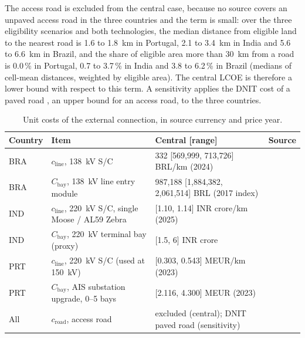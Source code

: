 The access road is excluded from the central case, because no source
covers an unpaved access road in the three countries and the term is
small: over the three eligibility scenarios and both technologies, the
median distance from eligible land to the nearest road is 1.6 to 1.8~km
in Portugal, 2.1 to 3.4~km in India and 5.6 to 6.6~km in Brazil, and the
share of eligible area more than 30~km from a road is 0.0\,\% in Portugal,
0.7 to 3.7\,\% in India and 3.8 to 6.2\,\% in Brazil (medians of cell-mean
distances, weighted by eligible area).
The central LCOE is therefore a lower
bound with respect to this term. A sensitivity applies the DNIT cost of a
paved road \cite{dnit2016}, an upper bound for an access road, to the
three countries.

\begin{table}[htbp]
    \centering
    \caption{Unit costs of the external connection, in source currency and price year.}
    \label{tab:g3_costs}
    \small
    \begin{tabularx}{\textwidth}{@{}l
        >{\raggedright\arraybackslash}X
        >{\raggedright\arraybackslash}p{3.3cm}
        >{\raggedright\arraybackslash}p{2.3cm}@{}}
        \toprule
        Country & Item & Central [range] & Source \\
        \midrule
        BRA & $c_{\mathrm{line}}$, 138~kV S/C
            & 598{,}332 [569{,}999, 713{,}726] BRL/km (2024)
            & \cite{aneelBPR} \\
        BRA & $C_{\mathrm{bay}}$, 138~kV line entry module
            & 1{,}987{,}188 [1{,}884{,}382, 2{,}061{,}514] BRL (2017 index)
            & \cite{aneelBPR} \\
        IND & $c_{\mathrm{line}}$, 220~kV S/C, single Moose / AL59 Zebra
            & 1.10 [1.10, 1.14] INR crore/km (2025)
            & \cite{ctuilIndicative2025} \\
        IND & $C_{\mathrm{bay}}$, 220~kV terminal bay (proxy)
            & 3 [1.5, 6] INR crore
            & \cite{cerc2022gna} \\
        PRT & $c_{\mathrm{line}}$, 220~kV S/C (used at 150~kV)
            & 0.362 [0.303, 0.543] MEUR/km (2023)
            & \cite{acer2023uic} \\
        PRT & $C_{\mathrm{bay}}$, AIS substation upgrade, 0--5 bays
            & 2.789 [2.116, 4.300] MEUR (2023)
            & \cite{acer2023uic} \\
        All & $c_{\mathrm{road}}$, access road
            & excluded (central); DNIT paved road (sensitivity)
            & \cite{dnit2016} \\
        \bottomrule
    \end{tabularx}
\end{table}

